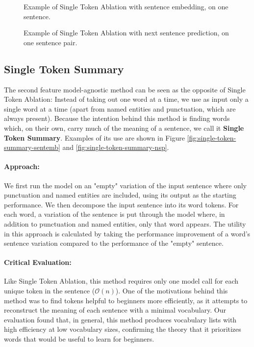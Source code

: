 \begin{figure}[H]
	
	\caption{Example of Single Token Ablation with sentence embedding, on one sentence.}
	\label{fig:single-token-ablation-sentemb}
\end{figure}

\begin{figure}[H]
	
	\caption{Example of Single Token Ablation with next sentence prediction, on one sentence pair.}
	\label{fig:single-token-ablation-nsp}
\end{figure}

\subsection{Single Token Summary} \label{sec:single-token-summary}
The second feature model-agnostic method can be seen as the opposite of Single Token Ablation:
Instead of taking out one word at a time, we use as input only a single word at a time (apart from named entities and punctuation, which are always present).
Because the intention behind this method is finding words which, on their own, carry much of the meaning of a sentence, we call it \textbf{Single Token Summary}.
Examples of its use are shown in Figure \ref{fig:single-token-summary-sentemb} and \ref{fig:single-token-summary-nsp}.

\paragraph{Approach:}
We first run the model on an "empty" variation of the input sentence where only punctuation and named entities are included, using its output as the starting performance.
We then decompose the input sentence into its word tokens.
For each word, a variation of the sentence is put through the model where, in addition to punctuation and named entities, only that word appears.
The utility in this approach is calculated by taking the performance improvement of a word's sentence variation compared to the performance of the "empty" sentence.

\paragraph{Critical Evaluation:}
Like Single Token Ablation, this method requires only one model call for each unique token in the sentence ($\mathcal{O}(n)$).
One of the motivations behind this method was to find tokens helpful to beginners more efficiently, as it attempts to reconstruct the meaning of each sentence with a minimal vocabulary.
Our evaluation found that, in general, this method produces vocabulary lists with high efficiency at low vocabulary sizes, confirming the theory that it prioritizes words that would be useful to learn for beginners.

